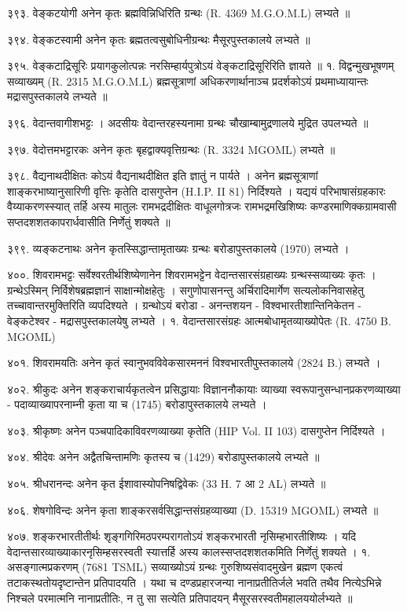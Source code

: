 ३९३. वेङ्कटयोगी
अनेन कृतः ब्रह्मविन्निधिरिति ग्रन्थः (R. 4369 M.G.O.M.L) लभ्यते ॥

३९४. वेङ्कटस्वामी
अनेन कृतः ब्रह्मतत्वसुबोधिनीग्रन्थः मैसूरपुस्तकालये लभ्यते ॥

३९५. वेङ्कटाद्रिसूरिः
प्रयागकुलोत्पन्नः नरसिम्हार्यपुत्रोऽयं वेङ्कटाद्रिसूरिरिति ज्ञायते ॥
१. विद्वन्मुखभूषणम् सव्याख्यम् (R. 2315 M.G.O.M.L)
ब्रह्मसूत्राणां अधिकरणार्थानाञ्च प्रदर्शकोऽयं प्रथमाध्यायान्तः मद्रासपुस्तकालये लभ्यते ॥

३९६. वेदान्तवागीशभट्टः ।
अदसीयः वेदान्तरहस्यनामा ग्रन्थः चौखाम्बामुद्रणालये मुद्रित उपलभ्यते ॥

३९७. वेदोत्तमभट्टारकः 
अनेन कृतः बृहद्वाक्यवृत्तिग्रन्थः (R. 3324 MGOML) लभ्यते ॥

३९८. वैद्यनाथदीक्षितः
कोऽयं वैद्यनाथदीक्षित इति ज्ञातुं न पार्यते । अनेन ब्रह्मसूत्राणां शाङ्करभाष्यानुसारिणी वृत्तिः कृतेति दासगुप्तेन (H.I.P. II 81) निर्दिश्यते । यद्ययं परिभाषासंग्रहकारः वैय्याकरणस्स्यात् तर्हि अस्य मातुलः रामभद्रदीक्षितः वाधूलगोत्रजः रामभद्रमखिशिष्यः कण्डरमाणिक्कग्रामवासी सप्तदशशतकापरार्धवासीति निर्णेतुं शक्यते ॥

३९९. व्यङ्कटनाथः
अनेन कृतस्सिद्धान्तामृताख्यः ग्रन्थः बरोडापुस्तकालये (1970) लभ्यते ।

४००. शिवरामभट्टः
सर्वेश्वरतीर्थशिष्येणानेन शिवरामभट्टेन वेदान्तसारसंग्रहाख्यः ग्रन्थस्सव्याख्यः कृतः । ग्रन्थेऽस्मिन् निर्विशेषब्रह्मज्ञानं साक्षान्मोक्षहेतुः । सगुणोपासनन्तु अर्चिरादिमार्गेण सत्यलोकनिवासहेतु तच्चावान्तरमुक्तिरिति व्यपदिश्यते । ग्रन्थोऽयं बरोडा - अनन्तशयन - विश्वभारतीशान्तिनिकेतन - वेङ्कटेश्वर - मद्रासपुस्तकालयेषु लभ्यते ।
१. वेदान्तसारसंग्रहः आत्मबोधामृतव्याख्योपेतः (R. 4750 B. MGOML)

४०१. शिवरामयतिः
अनेन कृतं स्वानुभवविवेकसारमननं विश्वभारतीपुस्तकालये (2824 B.) लभ्यते ।

४०२. श्रीकुदः
अनेन शङ्कराचार्यकृतत्वेन प्रसिद्धायाः विज्ञाननौकायाः व्याख्या स्वरूपानुसन्धानप्रकरणव्याख्या - पदाव्याख्यापरनाम्नी कृता या च (1745) बरोडापुस्तकालये लभ्यते ।
 
४०३. श्रीकृष्णः
अनेन पञ्चपादिकाविवरणव्याख्या कृतेति (HIP Vol. II 103) दासगुप्तेन निर्दिश्यते ।

४०४. श्रीदेवः
अनेन अद्वैतचिन्तामणिः कृतस्य च (1429) बरोडापुस्तकालये लभ्यते ॥

४०५. श्रीधरानन्दः
अनेन कृत ईशावास्योपनिषद्विवेकः (33 H. 7 आ 2 AL) लभ्यते ॥

४०६. शेषगोविन्दः
अनेन कृता शाङ्करसर्वसिद्धान्तसंग्रहव्याख्या (D. 15319 MGOML) लभ्यते ॥

४०७. शङ्करभारतीतीर्थः
शृङ्गगिरिमठपरम्परागतोऽयं शङ्करभारती नृसिम्हभारतीशिष्यः । यदि वेदान्तसारव्याख्याकारनृसिम्हसरस्वती स्यात्तर्हि अस्य कालस्सप्तदशशतकमिति निर्णेतुं शक्यते ।
१. असङ्गात्मप्रकरणम् (7681 TSML) सव्याख्योऽयं ग्रन्थः गुरुशिष्यसंवादमुखेन ब्रह्मण एकत्वं तटाकस्थतोयदृष्टान्तेन प्रतिपादयति । यथा च दण्डप्रहारजन्या नानाप्रतीतिर्जले भवति तथैव नित्येऽभिन्ने निश्चले परमात्मनि नानाप्रतीतिः, न तु सा सत्येति प्रतिपादयन् मैसूरसरस्वतीमहालययोर्लभ्यते ॥

